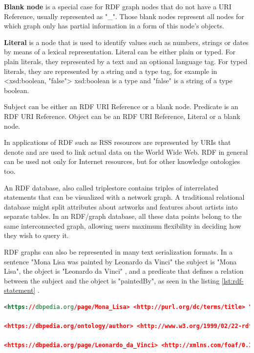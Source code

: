 \documentclass[thesis=M,english,hidelinks]{FITthesis}[2019/12/23]
\begin{document}
\textbf{Blank node} is a special case for \gls{RDF} graph nodes that do not have a \gls{URI} Reference, usually represented as "\_". Those blank nodes represent all nodes for which graph only has partial information in a form of this node's objects.

\textbf{Literal} is a node that is used to identify values such as numbers, strings or dates by means of a lexical representation. Literal can be either plain or typed. For plain literals, they represented by a text and an optional language tag. For typed literals, they are represented by a string and a type tag, for example in <xsd:boolean, "false"> xsd:boolean is a type and  "false" is a string of a type boolean.

Subject can be either an \gls{RDF} \gls{URI} Reference or a blank node. 
Predicate is an \gls{RDF} \gls{URI} Reference.
Object can be an \gls{RDF} \gls{URI} Reference, Literal or a blank node.

In applications of RDF such as \gls{RSS} resources are represented by URIs that denote and are used to link actual data on the World Wide Web\cite{rdf_concepts}. \gls{RDF} in general can be used not only for Internet resources, but for other knowledge ontologies too.

An \gls{RDF} database, also called triplestore contains triples of  interrelated statements that can be visualized with a network graph. A traditional relational database might split attributes about artworks and features about artists into separate tables. In an RDF/graph database, all these data points belong to the same interconnected graph, allowing users maximum flexibility in deciding how they wish to query it.

RDF graphs can also be represented in many text serialization formats. In a sentence "Mona Lisa was painted by Leonardo da Vinci" the subject is  "Mona Lisa", the object is "Leonardo da Vinci" , and a predicate  that defines a relation between the subject and the object is "paintedBy", as  seen in the listing \ref{lst:rdf-statement} .

\begin{lstlisting}[language=XML, caption=Example of an RDF statement, label = {lst:rdf-statement}]
<https://dbpedia.org/page/Mona_Lisa> <http://purl.org/dc/terms/title> "Mona Lisa" .

<https://dbpedia.org/ontology/author> <http://www.w3.org/1999/02/22-rdf-syntax-ns#label> "was created by" .

<https://dbpedia.org/page/Leonardo_da_Vinci> <http://xmlns.com/foaf/0.1/name> "Leonardo da Vinci" .
\end{lstlisting}
\end{document}
